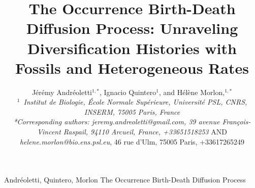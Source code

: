 \documentclass[oupdraft]{sysbio}
\begin{document}
\title{\textbf{The Occurrence Birth-Death Diffusion Process: Unraveling Diversification Histories with Fossils and Heterogeneous Rates}}


\author{Jérémy Andréoletti$^{1,\ast}$, Ignacio Quintero$^{1}$, and
Hélène Morlon,$^{1,\ast}$\\[4pt]
\textit{$^{1}$~Institut de Biologie, École Normale Supérieure, Université PSL, CNRS, INSERM, 75005 Paris, France}
\\[2pt]
\textit{*Corresponding authors: \textit{jeremy.andreoletti@gmail.com}, 39 avenue François-Vincent Raspail, 94110 Arcueil, France, +33651518253} AND \textit{helene.morlon@bio.ens.psl.eu}, 46 rue d'Ulm, 75005 Paris, +33617265249}


\markboth%
{Andréoletti, Quintero, Morlon}
{The Occurrence Birth-Death Diffusion Process}

\maketitle
\end{document}
